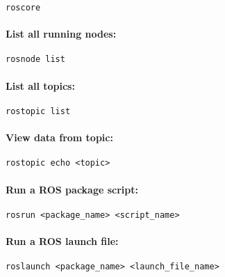 \begin{verbatim}
roscore
\end{verbatim}

\paragraph{List all running nodes:}

\begin{verbatim}
rosnode list
\end{verbatim}

\paragraph{List all topics:}

\begin{verbatim}
rostopic list
\end{verbatim}

\paragraph{View data from topic:}

\begin{verbatim}
rostopic echo <topic>
\end{verbatim}

\paragraph{Run a ROS package script:}

\begin{verbatim}
rosrun <package_name> <script_name>
\end{verbatim}

\paragraph{Run a ROS launch file:}

\begin{verbatim}
roslaunch <package_name> <launch_file_name>
\end{verbatim}
